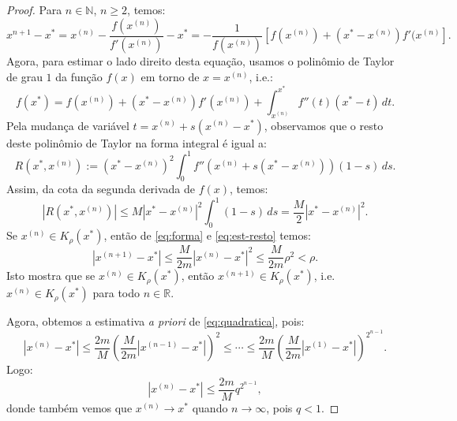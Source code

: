 \begin{proof}
  Para $n\in\mathbb{N}$, $n\geq 2$, temos:
  \begin{equation}\label{eq:forma}
    x^{n+1}-x^* = x^{(n)} - \frac{f(x^{(n)})}{f'(x^{(n)})} - x^* = -\frac{1}{f(x^{(n)})}\left[f(x^{(n)})+(x^*-x^{(n)})f'(x^{(n)}\right].
  \end{equation}
Agora, para estimar o lado direito desta equação, usamos o polinômio de Taylor de grau $1$ da função $f(x)$ em torno de $x = x^{(n)}$, i.e.:
\begin{equation*}
  f(x^*) = f(x^{(n)}) + (x^* - x^{(n)})f'(x^{(n)}) + \int_{x^{(n)}}^{x^*} f''(t)(x^* - t)\,dt.
\end{equation*}
Pela mudança de variável $t = x^{(n)} + s(x^{(n)} - x^*)$, observamos que o resto deste polinômio de Taylor na forma integral é igual a:
\begin{equation*}
  R(x^*,x^{(n)}) := (x^* - x^{(n)})^2\int_0^1 f''\left(x^{(n)} + s(x^* - x^{(n)})\right)(1-s)\,ds.
\end{equation*}
Assim, da cota da segunda derivada de $f(x)$, temos:
\begin{equation}\label{eq:est-resto}
  |R(x^*,x^{(n)})| \leq M|x^*-x^{(n)}|^2\int_0^1 (1-s)\,ds = \frac{M}{2}|x^* - x^{(n)}|^2.
\end{equation}\label{eq:quadratica}
Se $x^{(n)}\in K_\rho(x^*)$, então de \eqref{eq:forma} e \eqref{eq:est-resto} temos:
\begin{equation}
  |x^{(n+1)} - x^*| \leq \frac{M}{2m}|x^{(n)} - x^*|^2 \leq \frac{M}{2m}\rho^2 < \rho.
\end{equation}
Isto mostra que se $x^{(n)}\in K_\rho(x^*)$, então $x^{(n+1)}\in K_\rho(x^*)$, i.e. $x^{(n)}\in K_\rho(x^*)$ para todo $n\in\mathbb{R}$.

Agora, obtemos a estimativa \emph{a priori} de \eqref{eq:quadratica}, pois:
\begin{equation*}
  |x^{(n)} - x^*| \leq \frac{2m}{M}\left(\frac{M}{2m}|x^{(n-1)}-x^*|\right)^2 \leq \cdots \leq \frac{2m}{M}\left(\frac{M}{2m} |x^{(1)}-x^*|\right)^{2^{n-1}}.
\end{equation*}
Logo:
\begin{equation*}
  |x^{(n)} - x^*| \leq \frac{2m}{M}q^{2^{n-1}},
\end{equation*}
donde também vemos que $x^{(n)}\to x^*$ quando $n\to\infty$, pois $q < 1$.


\end{proof}
